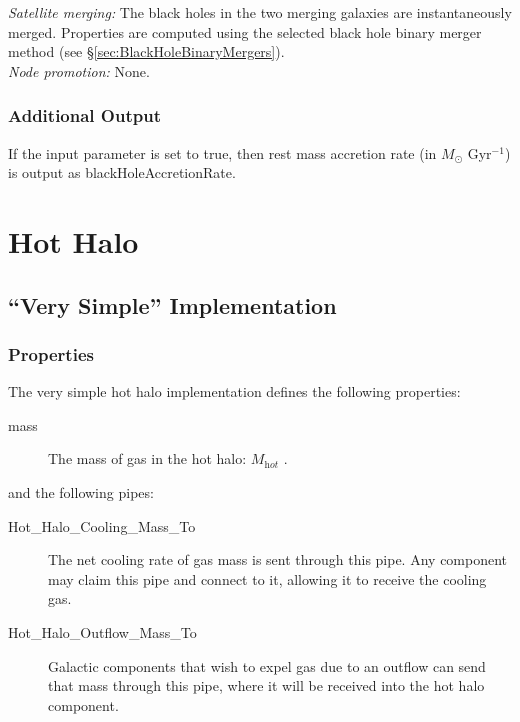 \noindent\emph{Satellite merging:} The black holes in the two merging galaxies are instantaneously merged. Properties are computed using the selected black hole binary merger method (see \S\ref{sec:BlackHoleBinaryMergers}).\\

\noindent\emph{Node promotion:} None.\\

\subsubsection{Additional Output}

If the {\normalfont \ttfamily [blackHoleOutputAccretion]} input parameter is set to true, then rest mass accretion rate (in $M_\odot$ Gyr$^{-1}$) is output as {\normalfont \ttfamily blackHoleAccretionRate}.

\section{Hot Halo}

\subsection{``Very Simple'' Implementation}

\subsubsection{Properties}

The very simple hot halo implementation defines the following properties:
\begin{description}
 \item [{\normalfont \ttfamily mass}] The mass of gas in the hot halo: $M_{\mathrm hot}$ {\normalfont \ttfamily [hotHaloMass]}.
\end{description}
and the following pipes:
\begin{description}
 \item [{\normalfont \ttfamily Hot\_Halo\_Cooling\_Mass\_To}] The net cooling rate of gas mass is sent through this pipe. Any \gls{component} may claim this pipe and connect to it, allowing it to receive the cooling gas.
 \item [{\normalfont \ttfamily Hot\_Halo\_Outflow\_Mass\_To}] Galactic components that wish to expel gas due to an outflow can send that mass  through this pipe, where it will be received into the hot halo component. 
\end{description}

